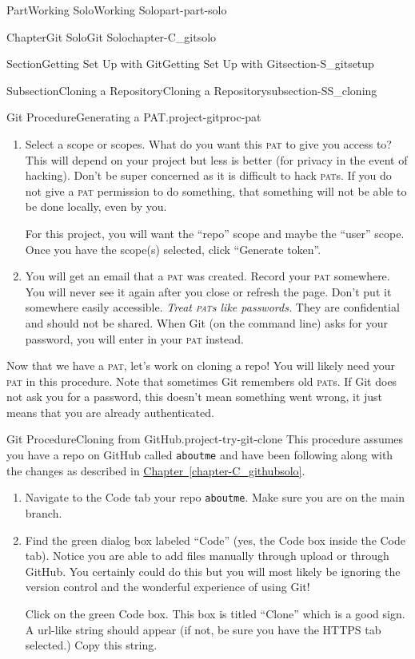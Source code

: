 \documentclass[oneside,10pt,]{book}
\newcommand{\xreffont}{\relax}
\newcommand{\mono}[1]{\texttt{#1}}
\newcommand{\acronym}[1]{\textsc{\MakeLowercase{#1}}}
\DeclareRobustCommand{\acronymintitle}[1]{\texorpdfstring{#1}{#1}}
\begin{document}
\begin{partptx}{Part}{Working Solo}{}{Working Solo}{}{}{part-part-solo}
\begin{chapterptx}{Chapter}{Git Solo}{}{Git Solo}{}{}{chapter-C_gitsolo}
\begin{sectionptx}{Section}{Getting Set Up with Git}{}{Getting Set Up with Git}{}{}{section-S_gitsetup}
\begin{subsectionptx}{Subsection}{Cloning a Repository}{}{Cloning a Repository}{}{}{subsection-SS_cloning}
\begin{project}{Git Procedure}{Generating a \acronymintitle{PAT}.}{project-gitproc-pat}
\begin{enumerate}[font=\bfseries,label=(\alph*),ref=\alph*]
\item{}Select a scope or scopes. What do you want this \acronym{PAT} to give you access to? This will depend on your project but less is better (for privacy in the event of hacking). Don't be super concerned as it is difficult to hack \acronym{PAT}s. If you do not give a \acronym{PAT} permission to do something, that something will not be able to be done locally, even by you.%
\par
For this project, you will want the ``repo'' scope and maybe the ``user'' scope. Once you have the scope(s) selected, click ``Generate token''.%
\item{}You will get an email that a \acronym{PAT} was created. Record your \acronym{PAT} somewhere. You will never see it again after you close or refresh the page. Don't put it somewhere easily accessible. \emph{Treat \acronym{PAT}s like passwords.} They are confidential and should not be shared. When Git (on the command line) asks for your password, you will enter in your \acronym{PAT} instead.%
\end{enumerate}%
\end{project}%
Now that we have a \acronym{PAT}, let's work on cloning a repo! You will likely need your \acronym{PAT} in this procedure. Note that sometimes Git remembers old \acronym{PAT}s. If Git does not ask you for a password, this doesn't mean something went wrong, it just means that you are already authenticated.%
\begin{project}{Git Procedure}{Cloning from GitHub.}{project-try-git-clone}%
%
This procedure assumes you have a repo on GitHub called \mono{aboutme} and have been following along with the changes as described in \hyperref[chapter-C_githubsolo]{Chapter~{\xreffont\ref{chapter-C_githubsolo}}}.%
\begin{enumerate}[font=\bfseries,label=(\alph*),ref=\alph*]%
\item{}Navigate to the Code tab your repo \mono{aboutme}. Make sure you are on the main branch.%
\item\label{task-clone-https}Find the green dialog box labeled ``Code'' (yes, the Code box inside the Code tab). Notice you are able to add files manually through upload or through GitHub. You certainly could do this but you will most likely be ignoring the version control and the wonderful experience of using Git!%
\par
Click on the green Code box. This box is titled ``Clone'' which is a good sign. A url-like string should appear (if not, be sure you have the HTTPS tab selected.) Copy this string.%

\end{enumerate}
\end{project}
\end{subsectionptx}
\end{sectionptx}
\end{chapterptx}
\end{partptx}
\end{document}
